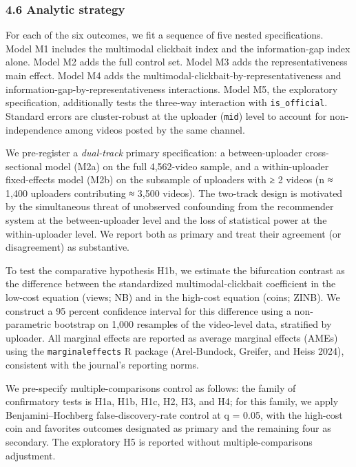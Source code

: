 \documentclass[
  12pt,
]{article}
\begin{document}
\subsubsection{4.6 Analytic strategy}\label{analytic-strategy}

For each of the six outcomes, we fit a sequence of five nested
specifications. Model M1 includes the multimodal clickbait index and the
information-gap index alone. Model M2 adds the full control set. Model
M3 adds the representativeness main effect. Model M4 adds the
multimodal-clickbait-by-representativeness and
information-gap-by-representativeness interactions. Model M5, the
exploratory specification, additionally tests the three-way interaction
with \texttt{is\_official}. Standard errors are cluster-robust at the
uploader (\texttt{mid}) level to account for non-independence among
videos posted by the same channel.

We pre-register a \emph{dual-track} primary specification: a
between-uploader cross-sectional model (M2a) on the full 4,562-video
sample, and a within-uploader fixed-effects model (M2b) on the subsample
of uploaders with ≥ 2 videos (n ≈ 1,400 uploaders contributing ≈ 3,500
videos). The two-track design is motivated by the simultaneous threat of
unobserved confounding from the recommender system at the
between-uploader level and the loss of statistical power at the
within-uploader level. We report both as primary and treat their
agreement (or disagreement) as substantive.

To test the comparative hypothesis H1b, we estimate the bifurcation
contrast as the difference between the standardized multimodal-clickbait
coefficient in the low-cost equation (views; NB) and in the high-cost
equation (coins; ZINB). We construct a 95 percent confidence interval
for this difference using a non-parametric bootstrap on 1,000 resamples
of the video-level data, stratified by uploader. All marginal effects
are reported as average marginal effects (AMEs) using the
\texttt{marginaleffects} R package (Arel-Bundock, Greifer, and Heiss
2024), consistent with the journal's reporting norms.

We pre-specify multiple-comparisons control as follows: the family of
confirmatory tests is H1a, H1b, H1c, H2, H3, and H4; for this family, we
apply Benjamini--Hochberg false-discovery-rate control at q = 0.05, with
the high-cost coin and favorites outcomes designated as primary and the
remaining four as secondary. The exploratory H5 is reported without
multiple-comparisons adjustment.
\end{document}

